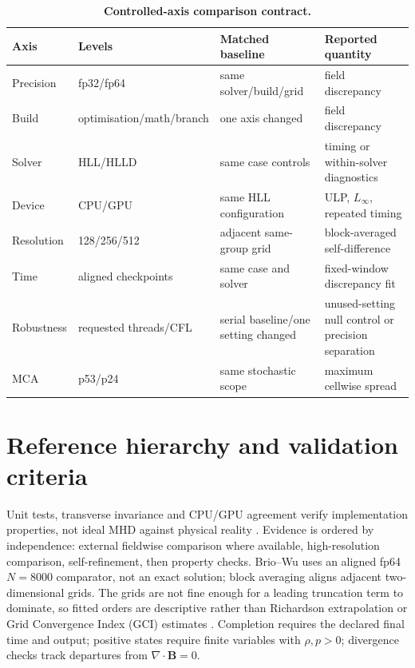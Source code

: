 \begin{table}[htbp]
\centering
\small
\begin{tabularx}{\textwidth}{@{}lllX@{}}
\toprule
Axis & Levels & Matched baseline & Reported quantity \\
\midrule
Precision & fp32/fp64 & same solver/build/grid & field discrepancy \\
Build & optimisation/math/branch & one axis changed & field discrepancy \\
Solver & HLL/HLLD & same case controls & timing or within-solver diagnostics \\
Device & CPU/GPU & same HLL configuration & ULP, $L_\infty$, repeated timing \\
Resolution & 128/256/512 & adjacent same-group grid & block-averaged self-difference \\
Time & aligned checkpoints & same case and solver & fixed-window discrepancy fit \\
Robustness & requested threads/CFL & serial baseline/one setting changed & unused-setting null control or precision separation \\
MCA & p53/p24 & same stochastic scope & maximum cellwise spread \\
\bottomrule
\end{tabularx}
\caption[Controlled-axis comparison contract]{\textbf{Controlled-axis
comparison contract.}}
\label{tab:ch3-axis-matrix}
\end{table}

\section{Reference hierarchy and validation criteria}
\label{sec:ch3-reference-hierarchy}

Unit tests, transverse invariance and CPU/GPU agreement verify implementation
properties, not ideal MHD against physical reality
\citep{oberkampfRoy2010vv}. Evidence is ordered by independence: external
fieldwise comparison where available, high-resolution comparison,
self-refinement, then property checks. Brio--Wu uses an aligned fp64 $N=8000$
comparator, not an exact solution; block averaging aligns adjacent
two-dimensional grids. The grids are not fine enough for a leading truncation
term to dominate, so fitted orders are descriptive rather than Richardson
extrapolation or Grid Convergence Index (GCI) estimates
\citep{roache1994gci}. Completion requires
the declared final time and output; positive states require finite variables
with $\rho,p>0$; divergence checks track departures from
$\nabla\!\cdot\mathbf B=0$.

